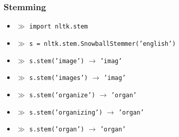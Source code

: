 \documentclass{beamer}
\begin{document}
\begin{frame}

    \frametitle{Stemming}

    	\begin{itemize}
    		\item[] $\gg$ {\tt import nltk.stem}
    		\item[] $\gg$ {\tt s = nltk.stem.SnowballStemmer('english')}
    		\item[] $\gg$ {\tt s.stem('image')} $\rightarrow$ {\tt 'imag'}
    		\item[] $\gg$ {\tt s.stem('images')} $\rightarrow$ {\tt 'imag'}
    		\item[] $\gg$ {\tt s.stem('organize')} $\rightarrow$ {\tt 'organ'}
    		\item[] $\gg$ {\tt s.stem('organizing')} $\rightarrow$ {\tt 'organ'}
			\item[] $\gg$ {\tt s.stem('organ')} $\rightarrow$ {\tt 'organ'}
    	\end{itemize}

\end{frame}
\end{document}
